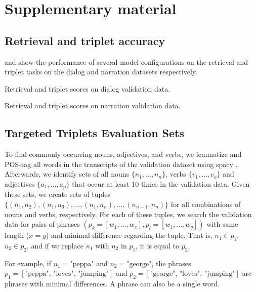 \appendix

\section{Supplementary material}

\subsection{Retrieval and triplet accuracy}
 and  show
the performance of several model configurations on the retrieval and
triplet tasks on the dialog and narration datasets respectively.
 \begin{table}
   \centering
   
   \caption{Retrieval and triplet scores on dialog validation data.}
   \label{tab:scores-dialog}
 \end{table}

\begin{table}
   \centering
   
   \caption{Retrieval and triplet scores on narration validation data.}
   \label{tab:scores-narration}
 \end{table}

\subsection{Targeted Triplets Evaluation Sets}\label{app:targeted_triplets_eval}

To find commonly occurring nouns, adjectives, and verbs, we lemmatize and POS-tag all words in the transcripts of the validation dataset using spacy \citep{honnibal2020spacy}. Afterwards, we identify sets of all nouns $\{n_1, ..., n_n\}$, verbs $\{v_1, ..., v_o\}$ and adjectives $\{a_1, ..., a_p\}$ that occur at least 10 times in the validation data. Given these sets, we create sets of tuples $\{(n_1, n_2), (n_1, n_3), ..., (n_1, n_n), ...,  (n_{n-1}, n_n)\}$ for all combinations of nouns and verbs, respectively. For each of these tuples, we search the validation data for pairs of phrases $(p_k=[w_1, ..., w_x], p_l=[w_1, ..., w_y])$ with same length ($x=y$) and minimal difference regarding the tuple. That is, $n_1 \in p_1$, $n_2 \in p_2$, and if we replace $n_1$ with $n_2$ in $p_1$, it is equal to $p_2$. 

For example, if $n_1 = \text{"peppa"}$ and $n_2 = \text{"george"}$, the phrases $p_1 = [\text{"peppa", "loves", "jumping"}]$ and $p_2 = [\text{"george", "loves", "jumping"}]$ are phrases with minimal differences. A phrase can also be a single word.

